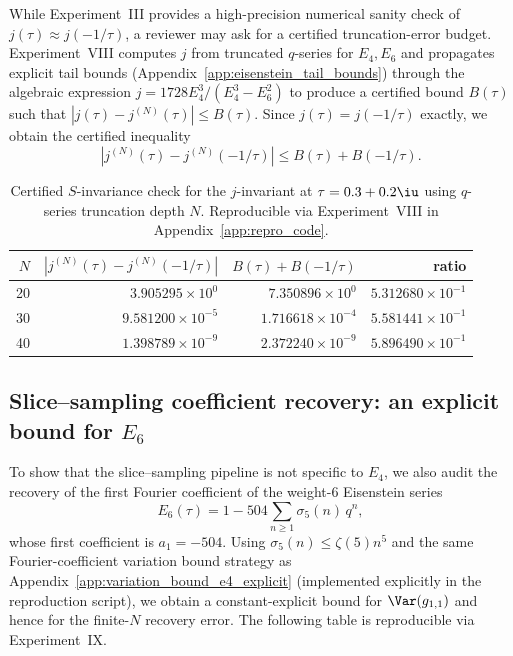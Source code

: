 While Experiment~III provides a high-precision numerical sanity check of $j(\tau)\approx j(-1/\tau)$, a reviewer may ask for a certified truncation-error budget. Experiment~VIII computes $j$ from truncated $q$-series for $E_4,E_6$ and propagates explicit tail bounds (Appendix~\ref{app:eisenstein_tail_bounds}) through the algebraic expression $j=1728 E_4^3/(E_4^3-E_6^2)$ to produce a certified bound $B(\tau)$ such that $|j(\tau)-j^{(N)}(\tau)|\le B(\tau)$. Since $j(\tau)=j(-1/\tau)$ exactly, we obtain the certified inequality
\begin{equation}
|j^{(N)}(\tau)-j^{(N)}(-1/\tau)|\le B(\tau)+B(-1/\tau).
\end{equation}

\begin{table}[H]
\centering
\begin{tabular}{rrrr}
\toprule
$N$ & $|j^{(N)}(\tau)-j^{(N)}(-1/\tau)|$ & $B(\tau)+B(-1/\tau)$ & ratio \\
\midrule
20 & $3.905295\times 10^{0}$ & $7.350896\times 10^{0}$ & $5.312680\times 10^{-1}$ \\
30 & $9.581200\times 10^{-5}$ & $1.716618\times 10^{-4}$ & $5.581441\times 10^{-1}$ \\
40 & $1.398789\times 10^{-9}$ & $2.372240\times 10^{-9}$ & $5.896490\times 10^{-1}$ \\
\bottomrule
\end{tabular}
\caption{Certified $S$-invariance check for the $j$-invariant at $\tau=0.3+0.2\iu$ using $q$-series truncation depth $N$. Reproducible via Experiment~VIII in Appendix~\ref{app:repro_code}.}
\label{tab:j_certified_S}
\end{table}

\subsection{Slice--sampling coefficient recovery: an explicit bound for \texorpdfstring{$E_6$}{E6}}
\label{app:quant_fits_slice_sampling_e6}

To show that the slice--sampling pipeline is not specific to $E_4$, we also audit the recovery of the first Fourier coefficient of the weight-$6$ Eisenstein series
\begin{equation}
E_6(\tau)=1-504\sum_{n\ge 1}\sigma_5(n)\,q^n,
\end{equation}
whose first coefficient is $a_1=-504$. Using $\sigma_5(n)\le \zeta(5)n^5$ and the same Fourier-coefficient variation bound strategy as Appendix~\ref{app:variation_bound_e4_explicit} (implemented explicitly in the reproduction script), we obtain a constant-explicit bound for $\Var(g_{1,1})$ and hence for the finite-$N$ recovery error. The following table is reproducible via Experiment~IX.

